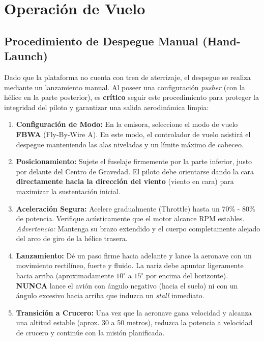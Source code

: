 \documentclass[11pt,a4paper]{article}
\begin{document}
\section{Operación de Vuelo}

\subsection{Procedimiento de Despegue Manual (Hand-Launch)}
Dado que la plataforma no cuenta con tren de aterrizaje, el despegue se realiza mediante un lanzamiento manual. Al poseer una configuración \textit{pusher} (con la hélice en la parte posterior), es \textbf{crítico} seguir este procedimiento para proteger la integridad del piloto y garantizar una salida aerodinámica limpia:

\begin{enumerate}[itemsep=1ex]
    \item \textbf{Configuración de Modo:} En la emisora, seleccione el modo de vuelo \textbf{FBWA} (Fly-By-Wire A). En este modo, el controlador de vuelo asistirá el despegue manteniendo las alas niveladas y un límite máximo de cabeceo.
    \item \textbf{Posicionamiento:} Sujete el fuselaje firmemente por la parte inferior, justo por delante del Centro de Gravedad. El piloto debe orientarse dando la cara \textbf{directamente hacia la dirección del viento} (viento en cara) para maximizar la sustentación inicial.
    \item \textbf{Aceleración Segura:} Acelere gradualmente (Throttle) hasta un 70\% - 80\% de potencia. Verifique acústicamente que el motor alcance RPM estables. \textit{Advertencia:} Mantenga su brazo extendido y el cuerpo completamente alejado del arco de giro de la hélice trasera.
    \item \textbf{Lanzamiento:} Dé un paso firme hacia adelante y lance la aeronave con un movimiento rectilíneo, fuerte y fluido. La nariz debe apuntar ligeramente hacia arriba (aproximadamente $10^\circ$ a $15^\circ$ por encima del horizonte). \textbf{NUNCA} lance el avión con ángulo negativo (hacia el suelo) ni con un ángulo excesivo hacia arriba que induzca un \textit{stall} inmediato.
    \item \textbf{Transición a Crucero:} Una vez que la aeronave gana velocidad y alcanza una altitud estable (aprox. 30 a 50 metros), reduzca la potencia a velocidad de crucero y continúe con la misión planificada.
\end{enumerate}
\end{document}
